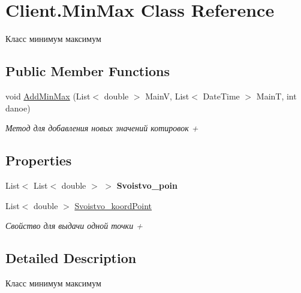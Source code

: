 \hypertarget{class_client_1_1_min_max}{}\section{Client.\+Min\+Max Class Reference}
\label{class_client_1_1_min_max}


Класс минимум максимум  


\subsection*{Public Member Functions}
\begin{DoxyCompactItemize}
\item 
void \hyperlink{class_client_1_1_min_max_a934226500c94c8d23994e2e346064517}{Add\+Min\+Max} (List$<$ double $>$ MainV, List$<$ Date\+Time $>$ MainT, int danoe)
\begin{DoxyCompactList}\small\item\em Метод для добавления новых значений котировок + \end{DoxyCompactList}\end{DoxyCompactItemize}
\subsection*{Properties}
\begin{DoxyCompactItemize}
\item 
\hypertarget{class_client_1_1_min_max_a65fe5bc2479a2e72abcff93d9c1da080}{}\label{class_client_1_1_min_max_a65fe5bc2479a2e72abcff93d9c1da080} 
List$<$ List$<$ double $>$ $>$ {\bfseries Svoistvo\+\_\+poin}
\item 
List$<$ double $>$ \hyperlink{class_client_1_1_min_max_a4e646297b322a42a8ccf70187a6ed257}{Svoistvo\+\_\+koord\+Point}
\begin{DoxyCompactList}\small\item\em Свойство для выдачи одной точки + \end{DoxyCompactList}\end{DoxyCompactItemize}


\subsection{Detailed Description}
Класс минимум максимум 



